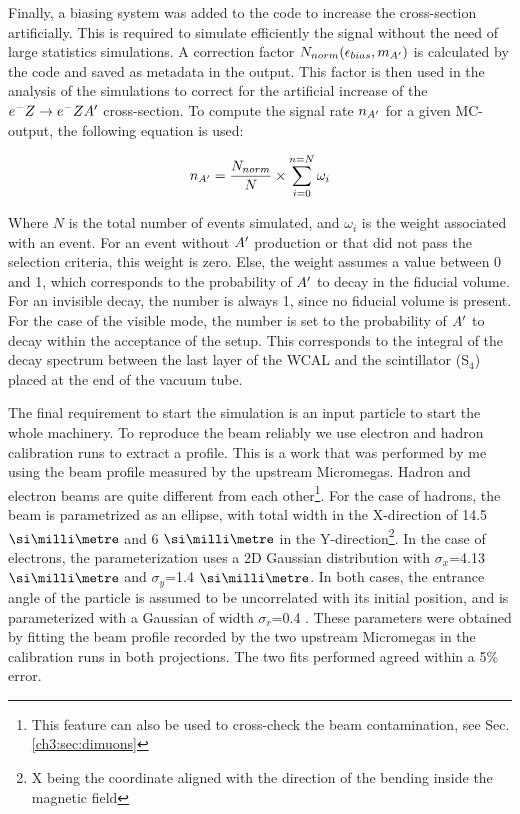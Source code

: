 Finally, a biasing system was added to the code to increase the cross-section artificially. This is required to simulate efficiently the signal without the need of large statistics simulations. A correction factor $N_{norm}(\epsilon_{bias},m_{A'})$ is calculated by the code and saved as metadata in the output. This factor is then used in the analysis of the simulations to correct for the artificial increase of the $e^- Z \to e^- Z A'$ cross-section. To compute the signal rate $n_{A'}$ for a given MC-output, the following equation is used:

\begin{equation}
  \label{eq:1}
  n_{A'} = \frac{N_{norm}}{N} \times \sum^{n=N}_{i=0} \omega_i
\end{equation}

Where $N$ is the total number of events simulated, and $\omega_i$ is the weight associated with an event. For an event without $A'$ production or that did not pass the selection criteria, this weight is zero. Else, the weight assumes a value between 0 and 1, which corresponds to the probability of $A'$ to decay in the fiducial volume. For an invisible decay, the number is always 1, since no fiducial volume is present. For the case of the visible mode, the number is set to the probability of $A'$ to decay within the acceptance of the setup. This corresponds to the integral of the decay spectrum between the last layer of the WCAL and the scintillator (S$_4$) placed at the end of the vacuum tube.

The final requirement to start the simulation is an input particle to start the whole machinery. 
To reproduce the beam reliably we use electron and hadron calibration runs to extract a profile. This is a work that was performed by me using the beam profile measured by the upstream Micromegas. Hadron and electron beams are quite different from each other\footnote{This feature can also be used to cross-check the beam contamination, see Sec.\ref{ch3:sec:dimuons}}. For the case of hadrons, the beam is parametrized as an ellipse, with total width in the X-direction of 14.5 $\mmi$ and 6 $\mmi$ in the Y-direction\footnote{X being the coordinate aligned with the direction of the bending inside the magnetic field}. In the case of electrons, the parameterization uses a 2D Gaussian distribution with $\sigma_x$=4.13 $\mmi$ and $\sigma_y$=1.4 $\mmi$. In both cases, the entrance angle of the particle is assumed to be uncorrelated with its initial position, and is parameterized with a Gaussian of width $\sigma_r$=0.4 \mrad. These parameters were obtained by fitting the beam profile recorded by the two upstream Micromegas in the calibration runs in both projections. The two fits performed agreed within a 5\% error.

